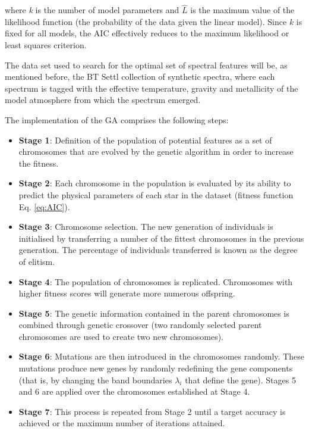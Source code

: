 \zeroindent{}

where \textit{k} is the number of model parameters and $\hat{L}$ is
the maximum value of the likelihood function (the probability of the
data given the linear model). Since $k$ is fixed for all models, the
AIC effectively reduces to the maximum likelihood or least squares
criterion.

The data set used to search for the optimal set of spectral features
will be, as mentioned before, the BT Settl collection of synthetic
spectra, where each spectrum is tagged with the effective temperature,
gravity and metallicity of the model atmosphere from which the
spectrum emerged.

The implementation of the GA comprises the following steps:

\begin{itemize}
\item \textbf{Stage 1}:{ Definition of the population of
potential features as a set of chromosomes that are evolved by the
genetic algorithm in order to increase the fitness.}

\item \textbf{Stage 2}:{ Each chromosome in the population
is evaluated by its ability to predict the physical parameters of each
star in the dataset (fitness function Eq. \ref{eq:AIC}). }

\item \textbf{Stage 3}:{ Chromosome selection. The new
generation of individuals is initialised by transferring a number of
the fittest chromosomes in the previous generation. The percentage of
individuals transferred is known as the degree of elitism.}

\item \textbf{Stage 4}:{ The population of chromosomes is replicated. 
 Chromosomes with higher fitness scores will generate more numerous
 offspring.}

\item \textbf{Stage 5}:{ The genetic information contained in
the parent chromosomes is combined through genetic crossover (two
randomly selected parent chromosomes are used to create two new
chromosomes).}

\item \textbf{Stage 6}:{ Mutations are then introduced in the
chromosomes randomly. These mutations produce new genes by
randomly redefining the gene components (that is, by changing the band
boundaries $\lambda_i$ that define the gene).  Stages 5 and 6 are
applied over the chromosomes established at Stage 4.}

\item \textbf{Stage 7}:{ This process is repeated from Stage 2 until 
a target accuracy is achieved or the maximum number of iterations
attained.}

\end{itemize}

